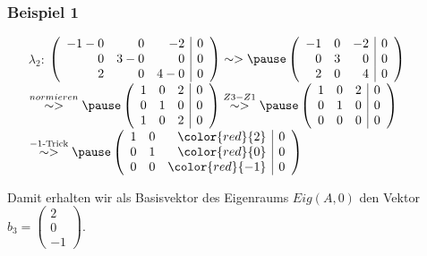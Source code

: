\begin{frame}\frametitle{Beispiel 1}
\begin{itemize}
\item[$\lambda_2$:]
$
\left(\begin{array}{rrr|r}
-1-0 & 0 & -2& 0 \\ 0 & 3-0 & 0& 0 \\ 2 & 0 &4-0& 0
\end{array}\right)
\sim >\pause
\left(\begin{array}{rrr|r}
-1 & 0 & -2& 0 \\ 0 & 3& 0& 0 \\ 2 & 0 &4& 0
\end{array}\right)
$\\
$\stackrel{normieren}{\sim >}\pause
\left(\begin{array}{rrr|r}
1 & 0 & 2& 0 \\ 0 & 1 & 0& 0 \\ 1 & 0 &2& 0
\end{array}\right)
\stackrel{Z3-Z1}{\sim >}\pause
\left(\begin{array}{rrr|r}
1 & 0 & 2& 0 \\ 0 & 1 & 0& 0 \\ 0 & 0 &0& 0
\end{array}\right)$\\
$
\stackrel{-1\text{-Trick}}{\sim >}\pause
\left(\begin{array}{rrr|r}
1 & 0 & \color{red}{2}& 0 \\ 0 & 1 & \color{red}{0}& 0 \\ 0 & 0 &\color{red}{-1}& 0
\end{array}\right)
$
\end{itemize}
Damit erhalten wir als Basisvektor des Eigenraums $Eig(A,0)$ den Vektor $b_3=\begin{pmatrix} 2 \\ 0 \\ -1\end{pmatrix}$.
\end{frame}
%
%
